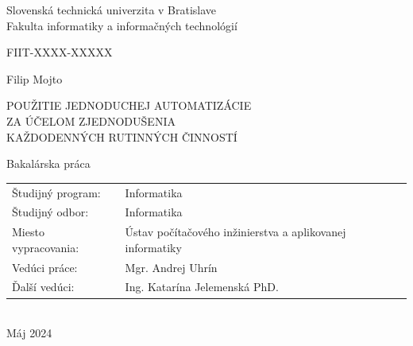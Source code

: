 \documentclass[twoside,slovak, a4paper]{article}
\begin{document}
\begin{titlepage}

\begin{center}

{\Large
Slovenská technická univerzita v Bratislave \\
Fakulta informatiky a informačných technológií \\

\vspace{0.4cm}

FIIT-XXXX-XXXXX

\vspace{5cm}

Filip Mojto \\

}


{\Large

\vspace{0.8cm}
POUŽITIE JEDNODUCHEJ AUTOMATIZÁCIE\\
ZA ÚČELOM ZJEDNODUŠENIA\\
KAŽDODENNÝCH RUTINNÝCH ČINNOSTÍ \\
\vspace{0.8cm}
}

{\Large
Bakalárska práca \\
}


\vspace{1cm} %
\vfill
\begin{flushleft}
\begin{tabular}{@{}ll}
Študijný program: & Informatika \\
Študijný odbor:  & Informatika \\
Miesto vypracovania: & Ústav počítačového inžinierstva a aplikovanej informatiky \\
Vedúci práce: & Mgr. Andrej Uhrín \\
Ďalší vedúci: & Ing. Katarína Jelemenská PhD. \\
\end{tabular}
\\
\vspace{0.7cm}
Máj 2024
\end{flushleft}
\vspace*{-2cm} %

\end{center}

\restoregeometry %

\end{titlepage}
\end{document}

